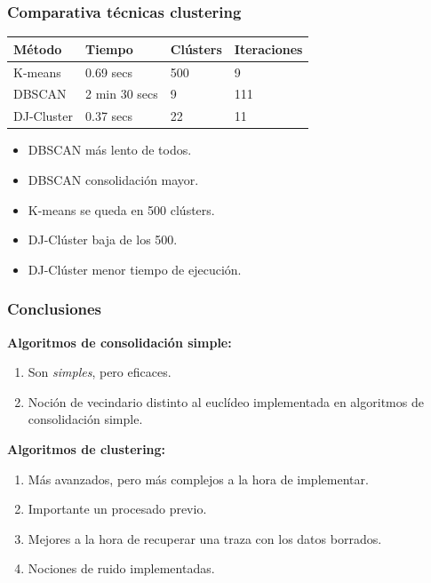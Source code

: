 \documentclass[10pt, spanish]{beamer}
\begin{document}
\begin{frame}[fragile]
\frametitle{Comparativa t\'ecnicas clustering}
\begin{center}
\begin{tabular}{|l|l|l|l|}
	\hline
	\rowcolor{Gray}
	M\'etodo & Tiempo & Cl\'usters & Iteraciones\\
	\hline	
	K-means & 0.69 secs & 500 & 9\\
	\hline
	DBSCAN &  2 min 30 secs & 9 & 111 \\
	\hline
	DJ-Cluster &  0.37 secs & 22  & 11\\
	\hline
\end{tabular}
\end{center}

\begin{itemize}
	\item DBSCAN m\'as lento de todos.
	\item DBSCAN consolidaci\'on mayor.
	\item K-means se queda en 500 cl\'usters.
	\item DJ-Cl\'uster baja de los 500.
	\item DJ-Cl\'uster menor tiempo de ejecuci\'on.
\end{itemize}

\end{frame}



\begin{frame}[fragile]
\frametitle{Conclusiones}
\textbf{Algoritmos de consolidaci\'on simple:}
\begin{enumerate}[<+- | alert@+>]
	\item Son \textit{simples}, pero eficaces.
	\item Noci\'on de vecindario distinto al eucl\'ideo implementada en algoritmos de consolidaci\'on simple.
\end{enumerate}

\textbf{Algoritmos de clustering:}
\begin{enumerate}[<+- | alert@+>]
	\item M\'as avanzados, pero m\'as complejos a la hora de implementar.
	\item Importante un procesado previo.
	\item Mejores a la hora de recuperar una traza con los datos borrados.
	\item Nociones de ruido implementadas.
\end{enumerate}
\end{frame}
\end{document}
